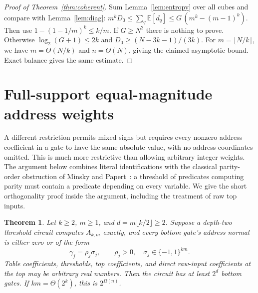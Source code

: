 \documentclass[11pt]{article}
\newtheorem{theorem}{Theorem}[section]
\begin{document}
\begin{proof}[Proof of Theorem~\ref{thm:coherent}]
Sum Lemma~\ref{lem:entropy} over all cubes and compare with
Lemma~\ref{lem:diag}: $m^kD_0\le\sum_q\mathbb E[d_q]\le G\,(m^k-(m-1)^k)$.
Then use $1-(1-1/m)^k\le k/m$. If $G\ge N^2$ there is nothing to prove. Otherwise $\log_2(G+1)\le2k$ and
$D_0\ge(N-3k-1)/(3k)$. For $m=\lfloor N/k\rfloor$, we have $m=\Theta(N/k)$ and $n=\Theta(N)$,
giving the claimed asymptotic bound. Exact balance gives the same estimate.
\end{proof}


\section{Full-support equal-magnitude address weights}\label{sec:fullsign}
A different restriction permits mixed signs but requires every nonzero
address coefficient in a gate to have the same absolute value, with no
address coordinates omitted. This is much more restrictive than allowing
arbitrary integer weights. The argument below combines literal identifications with the classical
parity-order obstruction of Minsky and Papert~\cite[Section~3.1]{MP}:
a threshold of predicates computing parity must contain a predicate
depending on every variable. We give the short orthogonality proof inside
the argument, including the treatment of raw top inputs.
\begin{theorem}\label{thm:fullsign}
Let $k\ge2$, $m\ge1$, and $d=m\lfloor k/2\rfloor\ge2$. Suppose a depth-two
threshold circuit computes $A_{k,m}$ exactly, and every bottom gate's address
normal is either zero or of the form
$$
\gamma_j=\rho_j\sigma_j,\qquad \rho_j>0,\quad
\sigma_j\in\{-1,1\}^{km}.
$$
Table coefficients, thresholds, top coefficients, and direct raw-input
coefficients at the top may be arbitrary real numbers. Then the circuit
has at least $2^d$ bottom gates. If $km=\Theta(2^k)$, this is $2^{\Omega(n)}$.
\end{theorem}
\end{document}
